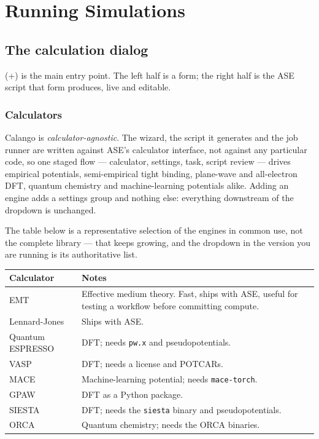 \chapter{Running Simulations}
\label{ch:simulations}

\section{The calculation dialog}

\menusep{} (+)
is the main entry point. The left half is a form; the right half is the ASE
script that form produces, live and editable.

\subsection{Calculators}

Calango is \emph{calculator-agnostic}. The wizard, the script it generates
and the job runner are written against ASE's calculator interface, not
against any particular code, so one staged flow --- calculator, settings,
task, script review --- drives empirical potentials, semi-empirical tight
binding, plane-wave and all-electron DFT, quantum chemistry and
machine-learning potentials alike. Adding an engine adds a settings group
and nothing else: everything downstream of the 
dropdown is unchanged.

The table below is a representative selection of the engines in common
use, not the complete library --- that keeps growing, and the
 dropdown in the version you are running is its
authoritative list.

\begin{center}
\small
\begin{tabular}{@{}lp{8.4cm}@{}}
\toprule
Calculator & Notes \\
\midrule
EMT             & Effective medium theory. Fast, ships with ASE, useful for
                  testing a workflow before committing compute. \\
Lennard-Jones   & Ships with ASE. \\
Quantum ESPRESSO& DFT; needs \texttt{pw.x} and pseudopotentials. \\
VASP            & DFT; needs a license and POTCARs. \\
MACE            & Machine-learning potential; needs \texttt{mace-torch}. \\
GPAW            & DFT as a Python package. \\
SIESTA          & DFT; needs the \texttt{siesta} binary and pseudopotentials. \\
ORCA            & Quantum chemistry; needs the ORCA binaries. \\
\bottomrule
\end{tabular}
\end{center}

